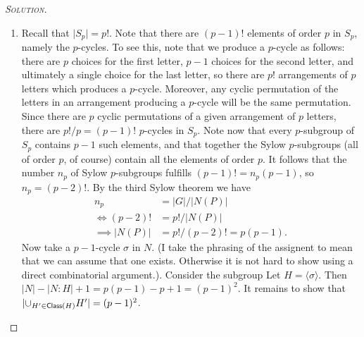 \begin{proof}[{\scshape Solution}]
  \hfill
  \begin{enumerate}[font=\normalfont,label=\textbf{(\Alph*)}, wide]


    \item Recall that $\lvert S_p \rvert = p!$. Note that there are $(p-1)!$ elements of order $p$ in $S_p$, namely the $p$-cycles. To see this, note that we produce a $p$-cycle as follows: there are $p$ choices for the first letter, $p-1$ choices for the second letter, and ultimately a single choice for the last letter, so there are $p!$ arrangements of $p$ letters which produces a $p$-cycle. Moreover, any cyclic permutation of the letters in an arrangement producing a $p$-cycle will be the same permutation. Since there are $p$ cyclic permutations of a given arrangement of $p$ letters, there are $p!/p = (p-1)!$ $p$-cycles in $S_p$. Note now that every $p$-subgroup of $S_p$ contains $p-1$ such elements, and that together the Sylow $p$-subgroups (all of order $p$, of course) contain all the elements of order $p$. It follows that the number $n_p$ of Sylow $p$-subgroups fulfills $(p-1)! = n_p (p-1)$, so $n_p = (p-2)!$. By the third Sylow theorem we have
    \[
    \begin{aligned}
      n_p &= \lvert G \rvert / \lvert N(P)\rvert\\
\iff (p-2)! &= p! / \lvert N(P)\rvert \\
      \implies\lvert N(P)\rvert &= p!/(p-2)! = p(p-1).
    \end{aligned}
    \]
    Now take a $p-1$-cycle $\sigma$ in $N$. (I take the phrasing of the assignent to mean that we can assume that one exists. Otherwise it is not hard to show using a direct combinatorial argument.). Consider the subgroup Let $H = \langle \sigma \rangle$. Then $\lvert N \rvert - \lvert N : H\rvert + 1 = p(p-1) - p + 1 = (p-1)^2$. It remains to show that $\lvert \cup_{H' \in \mathsf{Class}(H)} H' \rvert = (p-1)^2$.

\begin{comment}
    Let $\psi$ be a $p$-cycle generating $P$. In general it holds for subgroups $H, K$ of $N$ that $\lvert HK \rvert = \lvert H\rvert \lvert K \rvert / \lvert H\cap K \rvert$. Therefore $\lvert \langle \sigma \rangle\langle \psi \rangle\rvert  = \lvert \langle \sigma \rangle \rvert\lvert \langle \psi \rangle\rvert/\lvert \langle \sigma \rangle \cap \langle \psi \rangle \rvert = \lvert \langle \sigma \rangle \rvert\lvert \langle \psi \rangle\rvert = p(p-1)$. Hence $N$ is generated by $\sigma$ and $\psi$.
\end{comment}


\end{enumerate}
\end{proof}
